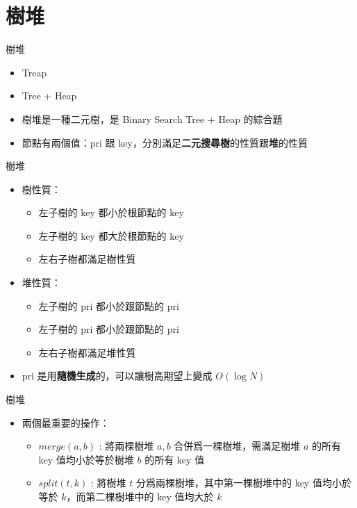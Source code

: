 \documentclass[standalone]{beamer}
\begin{document}
\section{樹堆}

\begin{frame}[fragile]{樹堆}
  \begin{itemize}
    \item Treap
    \item Tree + Heap
    \item 樹堆是一種二元樹，是 Binary Search Tree + Heap 的綜合題
    \item 節點有兩個值：pri 跟 key，分別滿足\textbf{二元搜尋樹}的性質跟\textbf{堆}的性質
  \end{itemize}
\end{frame}

\begin{frame}[fragile]{樹堆}
  \begin{itemize}
    \item 樹性質：
    \begin{itemize}
      \item 左子樹的 key 都小於根節點的 key
      \item 左子樹的 key 都大於根節點的 key
      \item 左右子樹都滿足樹性質
    \end{itemize}
    \item 堆性質：
      \begin{itemize}
        \item 左子樹的 pri 都小於跟節點的 pri
        \item 左子樹的 pri 都小於跟節點的 pri
        \item 左右子樹都滿足堆性質
      \end{itemize}
    \item pri 是用\textbf{隨機生成}的，可以讓樹高期望上變成 $O(\log N)$
  \end{itemize}
\end{frame}

\begin{frame}[fragile]{樹堆}
  \begin{itemize}
    \item 兩個最重要的操作：
    \begin{itemize}
      \item $merge(a, b)$ : 將兩棵樹堆 $a, b$ 合併爲一棵樹堆，需滿足樹堆 $a$ 的所有 key 值均小於等於樹堆 $b$ 的所有 key 值
      \item $split(t, k)$ : 將樹堆 $t$ 分爲兩棵樹堆，其中第一棵樹堆中的 key 值均小於等於 $k$，而第二棵樹堆中的 key 值均大於 $k$
    \end{itemize}
  \end{itemize}
\end{frame}
\end{document}
